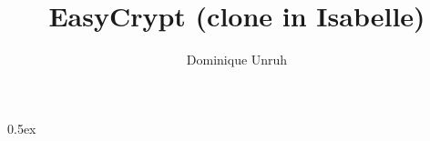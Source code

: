 \documentclass[11pt,a4paper]{article}
\begin{document}
\title{EasyCrypt (clone in Isabelle)}
\author{Dominique Unruh}
\maketitle

\tableofcontents

\parindent 0pt\parskip 0.5ex



%
%
\end{document}

